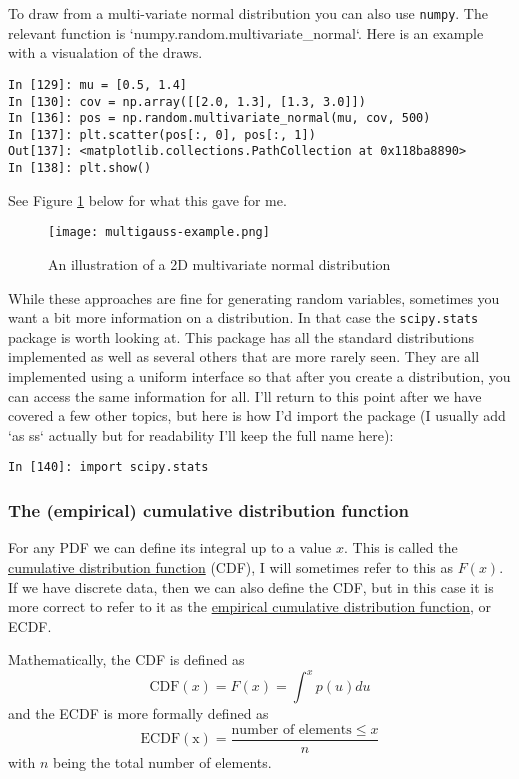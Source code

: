 \documentclass[a4paper,10pt]{article}
\newcommand{\link}[2]{{\color{blue}\href{#1}{#2}}}
\begin{document}
To draw from a multi-variate normal distribution you can also use \texttt{numpy}. The relevant function is `numpy.random.multivariate\_normal`. Here is an example with a visualation of the draws.
\begin{lstlisting}
In [129]: mu = [0.5, 1.4]
In [130]: cov = np.array([[2.0, 1.3], [1.3, 3.0]])
In [136]: pos = np.random.multivariate_normal(mu, cov, 500)
In [137]: plt.scatter(pos[:, 0], pos[:, 1])
Out[137]: <matplotlib.collections.PathCollection at 0x118ba8890>
In [138]: plt.show()
\end{lstlisting}

See Figure \ref{fig:mgauss} below for what this gave for me.
\begin{figure}[!h]
\texttt{[image: multigauss-example.png]}
\caption{An illustration of a 2D multivariate normal distribution }
\label{fig:mgauss}
\end{figure}

While these approaches are fine for generating random variables, sometimes you want a bit more information on a distribution. In that case the \texttt{scipy.stats} package is worth looking at. This package has all the standard distributions implemented as well as several others that are more rarely seen. They are all implemented using a uniform interface so that after you create a distribution, you can access the same information for all. I'll return to this point after we have covered a few other topics, but here is how I'd import the package (I usually add `as ss` actually but for readability I'll keep the full name here):
\begin{lstlisting}
In [140]: import scipy.stats 
\end{lstlisting}


\subsubsection{ The (empirical) cumulative distribution function}

For any PDF we can define its integral up to a value $x$. This is called the \link{https://en.wikipedia.org/wiki/Cumulative_distribution_function}{cumulative distribution function} (CDF), I will sometimes refer to this as $F(x)$. If we have discrete data, then we can also define the CDF, but in this case it is more correct to refer to it as the \link{https://en.wikipedia.org/wiki/Empirical_distribution_function}{empirical cumulative distribution function}, or ECDF.

Mathematically, the CDF is defined as
$$\mathrm{CDF}(x) = F(x) = \int^x p(u) du$$
and the ECDF is more formally defined as
$$\mathrm{ECDF(x)} = \frac{\mbox{number of elements}\le x}{n}$$
with $n$ being the total number of elements.
\end{document}
